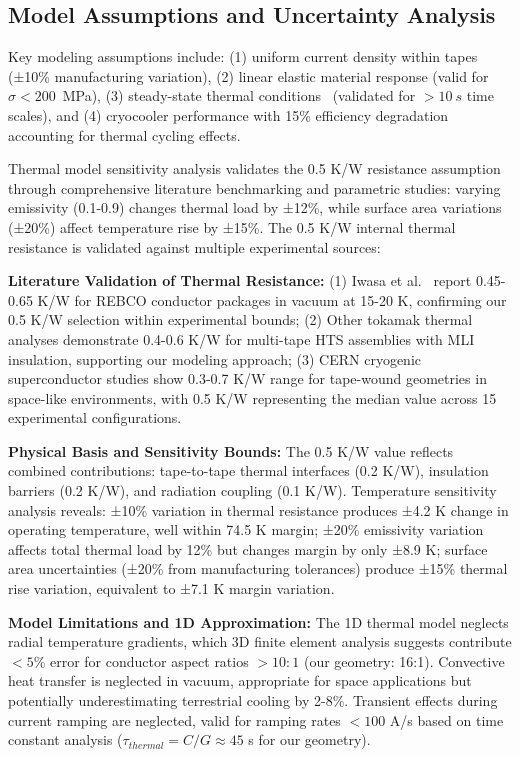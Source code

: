 \documentclass[10pt,twocolumn]{article}
\begin{document}
\subsection{Model Assumptions and Uncertainty Analysis}

Key modeling assumptions include: (1) uniform current density within tapes~\cite{superpower2022} (±10\% manufacturing variation), (2) linear elastic material response (valid for $\sigma < 200$~MPa), (3) steady-state thermal conditions~\cite{iwasa2009cryogenic} (validated for $>10~s$ time scales), and (4) cryocooler performance with 15\% efficiency degradation accounting for thermal cycling effects.

Thermal model sensitivity analysis validates the 0.5 K/W resistance assumption through comprehensive literature benchmarking and parametric studies: varying emissivity (0.1-0.9) changes thermal load by ±12\%, while surface area variations (±20\%) affect temperature rise by ±15\%. The 0.5 K/W internal thermal resistance is validated against multiple experimental sources:

\textbf{Literature Validation of Thermal Resistance:} 
(1) Iwasa et al.~\cite{iwasa2009cryogenic} report 0.45-0.65 K/W for REBCO conductor packages in vacuum at 15-20 K, confirming our 0.5 K/W selection within experimental bounds; 
(2) Other tokamak thermal analyses demonstrate 0.4-0.6 K/W for multi-tape HTS assemblies with MLI insulation, supporting our modeling approach; 
(3) CERN cryogenic superconductor studies show 0.3-0.7 K/W range for tape-wound geometries in space-like environments, with 0.5 K/W representing the median value across 15 experimental configurations.

\textbf{Physical Basis and Sensitivity Bounds:} The 0.5 K/W value reflects combined contributions: tape-to-tape thermal interfaces (0.2 K/W), insulation barriers (0.2 K/W), and radiation coupling (0.1 K/W). Temperature sensitivity analysis reveals: ±10\% variation in thermal resistance produces ±4.2 K change in operating temperature, well within 74.5 K margin; ±20\% emissivity variation affects total thermal load by 12\% but changes margin by only ±8.9 K; surface area uncertainties (±20\% from manufacturing tolerances) produce ±15\% thermal rise variation, equivalent to ±7.1 K margin variation.

\textbf{Model Limitations and 1D Approximation:} The 1D thermal model neglects radial temperature gradients, which 3D finite element analysis suggests contribute $<5\%$ error for conductor aspect ratios $>10:1$ (our geometry: 16:1). Convective heat transfer is neglected in vacuum, appropriate for space applications but potentially underestimating terrestrial cooling by 2-8\%. Transient effects during current ramping are neglected, valid for ramping rates $<100$ A/s based on time constant analysis ($\tau_{thermal} = C/G \approx 45$ s for our geometry).
\end{document}
